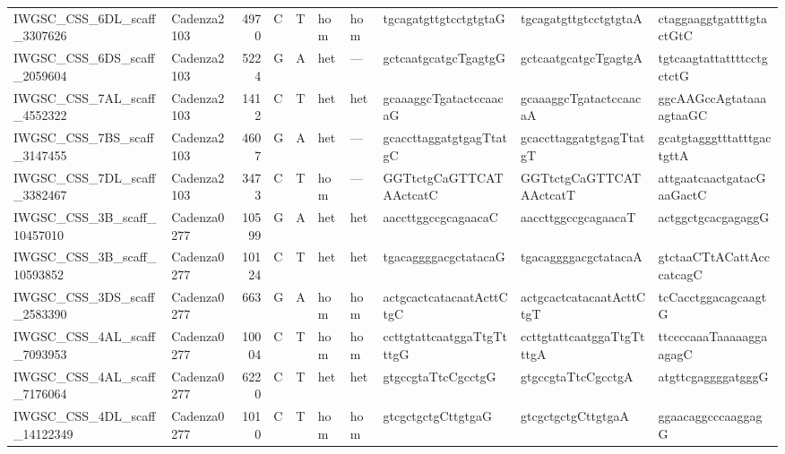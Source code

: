 \begin{tabular}{llrlllllll}
 IWGSC\_CSS\_6DL\_scaff\_3307626  & Cadenza2103 &       4970 & C         & T        & hom            & hom         & tgcagatgttgtcctgtgtaG     & tgcagatgttgtcctgtgtaA     & ctaggaaggtgattttgtactGtC  \\
 IWGSC\_CSS\_6DS\_scaff\_2059604  & Cadenza2103 &       5224 & G         & A        & het            & ---         & gctcaatgcatgcTgagtgG      & gctcaatgcatgcTgagtgA      & tgtcaagtattattttcctgctctG \\
 IWGSC\_CSS\_7AL\_scaff\_4552322  & Cadenza2103 &       1412 & C         & T        & het            & het         & gcaaaggcTgatactccaacaG    & gcaaaggcTgatactccaacaA    & ggcAAGccAgtataaaagtaaGC   \\
 IWGSC\_CSS\_7BS\_scaff\_3147455  & Cadenza2103 &       4607 & G         & A        & het            & ---         & gcaccttaggatgtgagTtatgC   & gcaccttaggatgtgagTtatgT   & gcatgtagggtttatttgactgttA \\
 IWGSC\_CSS\_7DL\_scaff\_3382467  & Cadenza2103 &       3473 & C         & T        & hom            & ---         & GGTtctgCaGTTCATAActcatC   & GGTtctgCaGTTCATAActcatT   & attgaatcaactgatacGaaGactC \\
 IWGSC\_CSS\_3B\_scaff\_10457010  & Cadenza0277 &      10599 & G         & A        & het            & het         & aaccttggccgcagaacaC       & aaccttggccgcagaacaT       & actggctgcacgagaggG        \\
 IWGSC\_CSS\_3B\_scaff\_10593852  & Cadenza0277 &      10124 & C         & T        & het            & het         & tgacaggggacgctatacaG      & tgacaggggacgctatacaA      & gtctaaCTtACattAcccatcagC  \\
 IWGSC\_CSS\_3DS\_scaff\_2583390  & Cadenza0277 &        663 & G         & A        & hom            & hom         & actgcactcatacaatActtCtgC  & actgcactcatacaatActtCtgT  & tcCacctggacagcaagtG       \\
 IWGSC\_CSS\_4AL\_scaff\_7093953  & Cadenza0277 &      10004 & C         & T        & hom            & hom         & ccttgtattcaatggaTtgTtttgG & ccttgtattcaatggaTtgTtttgA & ttccccaaaTaaaaaggaagagC   \\
 IWGSC\_CSS\_4AL\_scaff\_7176064  & Cadenza0277 &       6220 & C         & T        & het            & het         & gtgccgtaTtcCgcctgG        & gtgccgtaTtcCgcctgA        & atgttcgaggggatgggG        \\
 IWGSC\_CSS\_4DL\_scaff\_14122349 & Cadenza0277 &       1010 & C         & T        & hom            & hom         & gtcgctgctgCttgtgaG        & gtcgctgctgCttgtgaA        & ggaacaggcccaaggagG        \\

\end{tabular}
